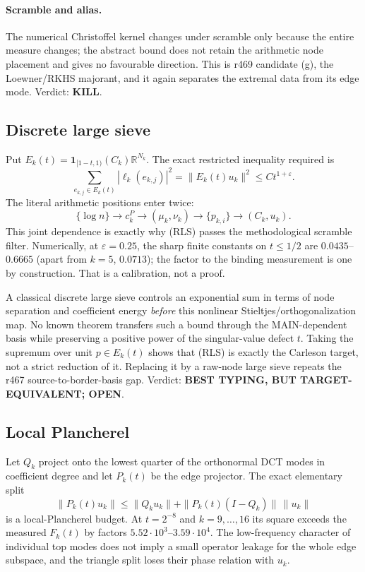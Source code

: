 \documentclass[11pt]{article}
\theoremstyle{remark}
\begin{document}
\paragraph{Scramble and alias.}
The numerical Christoffel kernel changes under scramble only because
the entire measure changes; the abstract bound does not retain the
arithmetic node placement and gives no favourable direction.  This is
r469 candidate (g), the Loewner/RKHS majorant, and it again separates
the extremal data from its edge mode.  Verdict: \textbf{KILL}.

\subsection{Discrete large sieve}

Put $E_k(t)=\mathbf1_{[1-t,1)}(C_k)\mathbb R^{N_k}$.  The exact
restricted inequality required is
\[
 \sum_{e_{k,j}\in E_k(t)}
 |\ell_k(e_{k,j})|^2
 =\|E_k(t)u_k\|^2
 \le C t^{1+\varepsilon}.
\tag{RLS}
\]
The literal arithmetic positions enter twice:
\[
 \{\log n\}\longrightarrow c_k^P\longrightarrow(\mu_k,\nu_k)
 \longrightarrow\{p_{k,i}\}\longrightarrow(C_k,u_k).
\]
This joint dependence is exactly why (RLS) passes the methodological
scramble filter.  Numerically, at $\varepsilon=0.25$, the sharp finite
constants on $t\le1/2$ are $0.0435$--$0.6665$ (apart from $k=5$,
$0.0713$); the factor to the binding measurement is one by construction.
That is a calibration, not a proof.

A classical discrete large sieve controls an exponential sum in terms
of node separation and coefficient energy \emph{before} this nonlinear
Stieltjes/orthogonalization map.  No known theorem transfers such a
bound through the MAIN-dependent basis while preserving a positive
power of the singular-value defect $t$.  Taking the supremum over unit
$p\in E_k(t)$ shows that (RLS) is exactly the Carleson target, not a
strict reduction of it.  Replacing it by a raw-node large sieve repeats
the r467 source-to-border-basis gap.  Verdict: \textbf{BEST TYPING,
BUT TARGET-EQUIVALENT; OPEN}.

\subsection{Local Plancherel}

Let $Q_k$ project onto the lowest quarter of the orthonormal DCT modes
in coefficient degree and let $P_k(t)$ be the edge projector.  The
exact elementary split
\[
 \|P_k(t)u_k\|
 \le\|Q_ku_k\|+\|P_k(t)(I-Q_k)\|\,\|u_k\|
\tag{Pl}
\]
is a local-Plancherel budget.  At $t=2^{-8}$ and $k=9,\ldots,16$ its
square exceeds the measured $F_k(t)$ by factors
$5.52\cdot10^3$--$3.59\cdot10^4$.  The low-frequency character of
individual top modes does not imply a small operator leakage for the
whole edge subspace, and the triangle split loses their phase relation
with $u_k$.
\end{document}
